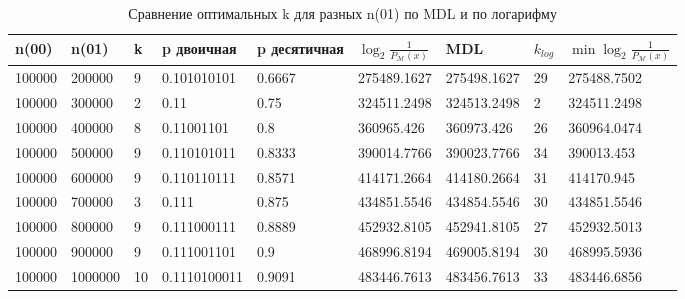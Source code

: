 \documentclass[12pt]{article}
\begin{document}
	\begin{table}[!h]
		\caption{Сравнение оптимальных k для разных n(01) по MDL и по логарифму}
		\label{table:comparison}
		\begin{center}
			\begin{tabular}{|l|l|l|l|l|l|l|l|l|}
				\hline
				n(00) & n(01) & k & p двоичная & p десятичная & $\log_2{\frac{1}{P_{\mathcal{M}}(x)}}$& MDL & $k_{log}$ & $\min\log_2{\frac{1}{P_{\mathcal{M}}(x)}}$  \\
				\hline 
				100000 & 200000 & 9 & 0.101010101 & 0.6667 & 275489.1627 & 275498.1627 & 29 & 275488.7502 \\ 
				\hline 
				100000 & 300000 & 2 & 0.11 & 0.75 & 324511.2498 & 324513.2498 & 2 & 324511.2498 \\ 
				\hline 
				100000 & 400000 & 8 & 0.11001101 & 0.8 & 360965.426 & 360973.426 & 26 & 360964.0474 \\ 
				\hline 
				100000 & 500000 & 9 & 0.110101011 & 0.8333 & 390014.7766 & 390023.7766 & 34 & 390013.453 \\ 
				\hline 
				100000 & 600000 & 9 & 0.110110111 & 0.8571 & 414171.2664 & 414180.2664 & 31 & 414170.945 \\ 
				\hline 
				100000 & 700000 & 3 & 0.111 & 0.875 & 434851.5546 & 434854.5546 & 30 & 434851.5546 \\ 
				\hline 
				100000 & 800000 & 9 & 0.111000111 & 0.8889 & 452932.8105 & 452941.8105 & 27 & 452932.5013 \\ 
				\hline 
				100000 & 900000 & 9 & 0.111001101 & 0.9 & 468996.8194 & 469005.8194 & 30 & 468995.5936 \\ 
				\hline 
				100000 & 1000000 & 10 & 0.1110100011 & 0.9091 & 483446.7613 & 483456.7613 & 33 & 483446.6856 \\ 
				\hline 
			\end{tabular}
		\end{center}
	\end{table}
	
\end{document}
